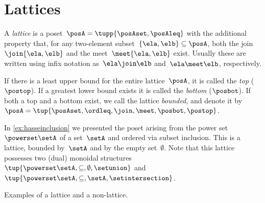 
\section{Lattices}


\begin{definition}[Lattice]
	\label{def:lattice}
	A \emph{lattice} is a poset~$\posA=\tupp{\posAset,\posAleq}$ with the additional property that, for any two-element subset~$\{\ela, \elb \} \subseteq \posA$, both the join~$\join \{\ela, \elb \}$ and the meet~$\meet \{\ela, \elb \}$ exist.
	Usually these are written using infix notation as~$\ela \join \elb$ and~$\ela \meet \elb$, respectively.
\end{definition}


\begin{remark}
	\label{rem:bounded-lattices}
	\label{def:top}
	\label{def:bot}
	If there is a least upper bound for the entire lattice~$\posA$, it is called the \emph{top} ($\postop$).
	If a greatest lower bound exists it is called the \emph{bottom} ($\posbot$).
	If both a top and a bottom exist, we call the lattice \emph{bounded}, and denote it by~$\posA = \tup{\posAset,\ordleq,\join,\meet,\posbot,\postop}$.
\end{remark}

\begin{example}
	In \cref{ex:hasseinclusion} we presented the poset arising from the power set~$\powerset \setA$ of a set~$\setA$ and ordered via subset inclusion.
	This is a lattice, bounded by~$\setA$ and by the empty set~$\emptyset$.
	Note that this lattice possesses two (dual) monoidal structures~$\tup{\powerset \setA,\subseteq,\emptyset,\setunion}$ and~$\tup{\powerset \setA,\subseteq,\setA,\setintersection}$.
\end{example}

\begin{marginfigure}
	\centering

	\caption{Examples of a lattice and a non-lattice. }
	\label{fig:exlattice}
\end{marginfigure}

